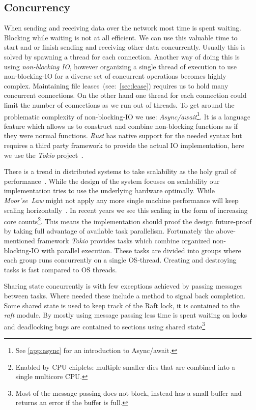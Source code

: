 \subsection{Concurrency}
When sending and receiving data over the network most time is spent waiting. Blocking while waiting is not at all efficient. We can use this valuable time to start and or finish sending and receiving other data concurrently. Usually this is solved by spawning a thread for each connection. Another way of doing this is using \textit{non-blocking IO}, however organizing a single thread of execution to use non-blocking-IO for a diverse set of concurrent operations becomes highly complex. 
Maintaining file leases~(see:~\cref{sec:lease}) requires us to hold many concurrent connections. On the other hand one thread for each connection could limit the number of connections as we run out of threads. To get around the problematic complexity of non-blocking-IO we use: \textit{Async/await}\footnote{See \cref{app:async} for an introduction to Async/await.}. It is a language feature which allows us to construct and combine non-blocking functions as if they were normal functions. \textit{Rust} has native support for the needed syntax but requires a third party framework to provide the actual IO implementation, here we use the \textit{Tokio} project~\cite{tokio}.

There is a trend in distributed systems to take scalability as the holy grail of performance~\cite{scaling}. While the design of the system focuses on scalability our implementation tries to use the underlying hardware optimally. 
While \textit{Moor'se~Law} might not apply any more single machine performance will keep scaling horizontally~\cite{moore}. In recent years we see this scaling in the form of increasing core counts\footnote{Enabled by CPU chiplets: multiple smaller dies that are combined into a single multicore CPU.}. This means the implementation should proof the design future-proof by taking full advantage of available task parallelism. Fortunately the above-mentioned framework \textit{Tokio} provides tasks which combine organized non-blocking-IO with parallel execution. These tasks are divided into groups where each group runs concurrently on a single OS-thread. Creating and destroying tasks is fast compared to OS threads.

Sharing state concurrently is with few exceptions achieved by passing messages between tasks. Where needed these include a method to signal back completion. Some shared state is used to keep track of the Raft lock, it is contained to the \textsl{raft} module. By mostly using message passing less time is spent waiting on locks and deadlocking bugs are contained to sections using shared state\footnote{Most of the message passing does not block, instead has a small buffer and returns an error if the buffer is full.} 

